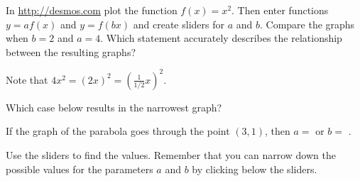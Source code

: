 \documentclass{ximera}
\begin{document}
\begin{question}
In \url{http://desmos.com} plot the function $f(x)=x^2$. Then enter functions $y=af(x)$ and $y=f(bx)$ and create sliders for $a$ and $b$. Compare the graphs when $b=2$ and $a=4$. Which statement accurately describes the relationship between the resulting graphs?
  \begin{solution}
    \begin{multiple-choice}
    \end{multiple-choice}
    \begin{hint}
    Note that $4x^2=(2x)^2=\left(\frac{1}{1/2}x\right)^2$.
    \end{hint}
Which case below results in the narrowest graph?
	\begin{multiple-choice}
    \end{multiple-choice}
If the graph of the parabola goes through the point $(3,1)$, then $a=$  or $b=$ .  
	\begin{hint}
    Use the sliders to find the values. Remember that you can narrow down the possible values for the parameters $a$ and $b$ by clicking below the sliders.
    \end{hint}
  \end{solution}
\end{question}
\end{document}
